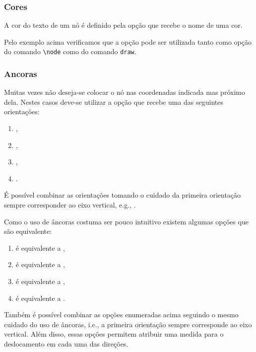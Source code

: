 \subsubsection{Cores}
A cor do texto de um n\'{o} \'{e} definido pela op\c{c}\~{a}o  que recebe o nome de uma cor. \\

Pelo exemplo acima verificamos que a op\c{c}\~{a}o  pode ser utilizada tanto como op\c{c}\~{a}o do comando \lstinline!\node! como do comando \lstinline!draw!.

\subsubsection{Ancoras}
Muitas vezes n\~{a}o deseja-se colocar o n\'{o} nas coordenadas indicada mas pr\'{o}ximo dela. Nestes casos deve-se utilizar a op\c{c}\~{a}o  que recebe uma das seguintes orienta\c{c}\~{o}es:
\begin{enumerate}
    \item {},
    \item {},
    \item {},
    \item {}.
\end{enumerate}

\'{E} poss\'{i}vel combinar as orienta\c{c}\~{o}es tomando o cuidado da primeira orienta\c{c}\~{a}o sempre corresponder ao eixo vertical, e.g., . \\

Como o uso de \^{a}ncoras costuma ser pouco intuitivo existem algumas op\c{c}\~{o}es que s\~{a}o equivalente:
\begin{enumerate}
    \item {} \'{e} equivalente a ,
    \item {} \'{e} equivalente a ,
    \item {} \'{e} equivalente a ,
    \item {} \'{e} equivalente a .
\end{enumerate}

Tamb\'{e}m \'{e} poss\'{i}vel combinar as op\c{c}\~{o}es enumeradas acima seguindo o mesmo cuidado do uso de \^{a}ncoras, i.e., a primeira orienta\c{c}\~{a}o sempre corresponde ao eixo vertical. Al\'{e}m disso, essas op\c{c}\~{o}es permitem atribuir uma medida para o deslocamento em cada uma das dire\c{c}\~{o}es. \\

